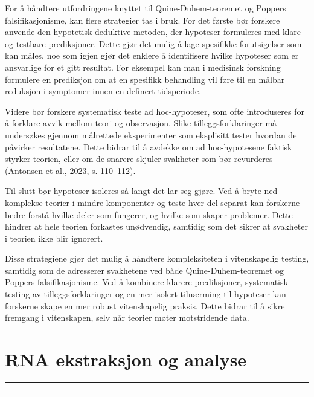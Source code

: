 \documentclass[
  letterpaper,
  DIV=11,
  numbers=noendperiod]{scrreprt}
\begin{document}
For å håndtere utfordringene knyttet til Quine-Duhem-teoremet og Poppers
falsifikasjonisme, kan flere strategier tas i bruk. For det første bør
forskere anvende den hypotetisk-deduktive metoden, der hypoteser
formuleres med klare og testbare prediksjoner. Dette gjør det mulig å
lage spesifikke forutsigelser som kan måles, noe som igjen gjør det
enklere å identifisere hvilke hypoteser som er ansvarlige for et gitt
resultat. For eksempel kan man i medisinsk forskning formulere en
prediksjon om at en spesifikk behandling vil føre til en målbar
reduksjon i symptomer innen en definert tidsperiode.

Videre bør forskere systematisk teste ad hoc-hypoteser, som ofte
introduseres for å forklare avvik mellom teori og observasjon. Slike
tilleggsforklaringer må undersøkes gjennom målrettede eksperimenter som
eksplisitt tester hvordan de påvirker resultatene. Dette bidrar til å
avdekke om ad hoc-hypotesene faktisk styrker teorien, eller om de
snarere skjuler svakheter som bør revurderes (Antonsen et al., 2023, s.
110--112).

Til slutt bør hypoteser isoleres så langt det lar seg gjøre. Ved å bryte
ned komplekse teorier i mindre komponenter og teste hver del separat kan
forskerne bedre forstå hvilke deler som fungerer, og hvilke som skaper
problemer. Dette hindrer at hele teorien forkastes unødvendig, samtidig
som det sikrer at svakheter i teorien ikke blir ignorert.

Disse strategiene gjør det mulig å håndtere kompleksiteten i
vitenskapelig testing, samtidig som de adresserer svakhetene ved både
Quine-Duhem-teoremet og Poppers falsifikasjonisme. Ved å kombinere
klarere prediksjoner, systematisk testing av tilleggsforklaringer og en
mer isolert tilnærming til hypoteser kan forskerne skape en mer robust
vitenskapelig praksis. Dette bidrar til å sikre fremgang i vitenskapen,
selv når teorier møter motstridende data.


\chapter{RNA ekstraksjon og analyse}\label{rna-ekstraksjon-og-analyse}

\begin{center}\rule{0.5\linewidth}{0.5pt}\end{center}

\begin{center}\rule{0.5\linewidth}{0.5pt}\end{center}
\end{document}
